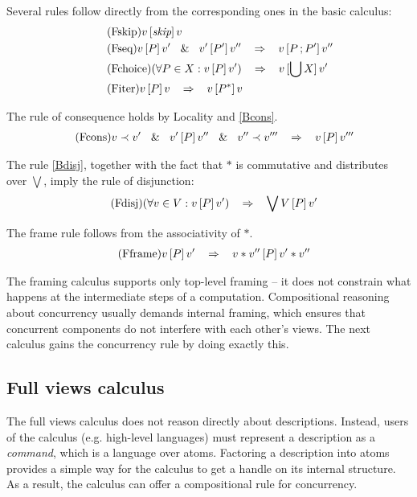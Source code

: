 \documentclass[a4paper,leqno]{llncs}
\newcommand{\mybox}[1]{\ensuremath{\text{\mbox{\ensuremath{#1}}}}}
\newcommand{\spacedwith}[2]{\ensuremath{\phantom{#2}#1\phantom{#2}}}
\newcommand{\spaced}[1]{\spacedwith{#1}{m}}
\newcommand{\primed}[1]{\ensuremath{#1^{\prime}}}
\newcommand{\dprimed}[1]{\ensuremath{#1^{\prime\prime}}}
\newcommand{\askip}{\ensuremath{\textit{skip}}}
\newcommand{\asemicolon}{\ensuremath{\,;}}
\newcommand{\alub}{\ensuremath{\bigcup}}
\newcommand{\kleene}[1]{\ensuremath{{#1}^*}}
\newcommand{\ftriple}[3]{\mybox{{#1}\spacedwith{[#2]}{\,}{#3}}}
\newcommand{\vstar}{\ensuremath{*}}
\newcommand{\vlub}{\ensuremath{\bigvee}}
\newcommand{\vangelic}{\ensuremath{\prec}}
\newcommand{\view}{\ensuremath{v}}
\newcommand{\vprime}{\primed{v}}
\newcommand{\vdprime}{\dprimed{\view}}
\newcommand{\vtprime}{\ensuremath{\view^{\prime\prime\prime}}}
\newcommand{\sand}{\spaced{\&}}
\newcommand{\simplies}{\spaced{\Rightarrow}}
\newcommand{\rulename}[1]{\tag{#1}\label{#1}}
\begin{document}
Several rules follow directly from the corresponding ones in the basic calculus:
\begin{align}
&\rulename{Fskip} \ftriple{\view}{\askip}{\view} \\
&\rulename{Fseq} \ftriple{\view}{P}{\vprime} \sand \ftriple{\vprime}{P^\prime}{\vdprime} \simplies \ftriple{\view}{P \asemicolon P^\prime}{\vdprime} \\
&\rulename{Fchoice} (\forall P \in X : \ftriple{\view}{P}{\vprime}) \simplies \ftriple{\view}{\alub X}{\vprime}\\
&\rulename{Fiter} \ftriple{\view}{P}{\view} \simplies \ftriple{\view}{\kleene{P}}{\view}
\end{align}

The rule of consequence holds by Locality and \eqref{Bcons}.
\begin{align}
&\rulename{Fcons} \view \vangelic \vprime \sand \ftriple{\vprime}{P}{\vdprime} \sand \vdprime \vangelic \vtprime \simplies \ftriple{\view}{P}{\vtprime}
\end{align}

The rule \eqref{Bdisj}, together with the fact that \vstar{} is commutative and distributes over \vlub, imply the rule of disjunction:
\begin{align}
&\rulename{Fdisj} (\forall \view \in V : \ftriple{\view}{P}{\vprime}) \simplies \ftriple{\vlub V}{P}{\vprime}
\end{align}

The frame rule follows from the associativity of \vstar.
\begin{align}
&\rulename{Fframe} \ftriple{\view}{P}{\vprime} \simplies \ftriple{\view \vstar \vdprime}{P}{\vprime \vstar \vdprime}
\end{align}

The framing calculus supports only top-level framing -- it does not constrain what happens at the intermediate steps of a computation. Compositional reasoning about concurrency usually demands internal framing, which ensures that concurrent components do not interfere with each other's views. The next calculus gains the concurrency rule by doing exactly this.

\subsection{Full views calculus}
The full views calculus does not reason directly about descriptions. Instead, users of the calculus (e.g. high-level languages) must represent a description as a \emph{command}, which is a language over atoms. Factoring a description into atoms provides a simple way for the calculus to get a handle on its internal structure. As a result, the calculus can offer a compositional rule for concurrency.
\end{document}

